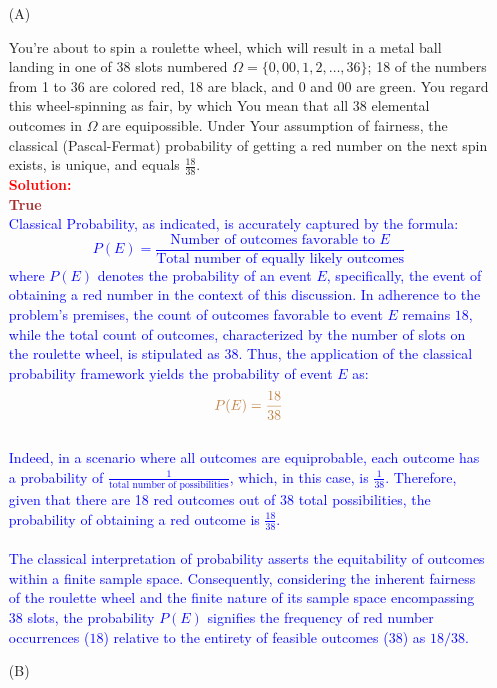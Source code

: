\documentclass[12pt]{article}
\begin{document}
\begin{itemize}

\item[(A)]

You're about to spin a roulette wheel, which will result in a metal ball
landing in one of 38 slots numbered $\Omega = \{ 0, 00, 1, 2, \dots, 36
\}$; 18 of the numbers from 1 to 36 are colored red, 18 are black, and 0
and 00 are green. You regard this wheel-spinning as fair, by which You mean
that all 38 elemental outcomes in $\Omega$ are equipossible. Under Your
assumption of fairness, the classical (Pascal-Fermat) probability of
getting a red number on the next spin exists, is unique, and equals $\frac{
18 }{ 38 }$. \\
\textcolor{red}{\textbf{Solution:}} \\
\textbf{\textcolor{brown}{True}} \\
\textcolor{blue}{
Classical Probability, as indicated, is accurately captured by the formula:
\[ P(E) = \frac{\text{Number of outcomes favorable to } E}{\text{Total number of equally likely outcomes}} \]
where \textcolor{blue}{\(P(E)\)} denotes the probability of an event \textcolor{blue}{\(E\)}, specifically, the event of obtaining a red number in the context of this discussion.
In adherence to the problem's premises, the count of outcomes favorable to event \textcolor{blue}{\(E\)} remains \textcolor{blue}{\(18\)}, while the total count of outcomes, characterized by the number of slots on the roulette wheel, is stipulated as \textcolor{blue}{\(38\)}.
Thus, the application of the classical probability framework yields the probability of event \textcolor{blue}{\(E\)} as:
\[ \textcolor{brown}{P(E) = \frac{18}{38}} \] \\
Indeed, in a scenario where all outcomes are equiprobable, each outcome has a probability of \( \frac{1}{\text{total number of possibilities}} \), which, in this case, is \( \frac{1}{38} \). Therefore, given that there are 18 red outcomes out of 38 total possibilities, the probability of obtaining a red outcome is \( \frac{18}{38} \). \\ \\
The classical interpretation of probability asserts the equitability of outcomes within a finite sample space. Consequently, considering the inherent fairness of the roulette wheel and the finite nature of its sample space encompassing \textcolor{blue}{\(38\)} slots, the probability \textcolor{blue}{\(P(E)\)} signifies the frequency of red number occurrences (\textcolor{blue}{\(18\)}) relative to the entirety of feasible outcomes (\textcolor{blue}{\(38\)}) as \textcolor{blue}{\(18/38\)}.
}
\item[(B)]


\end{itemize}
\end{document}
